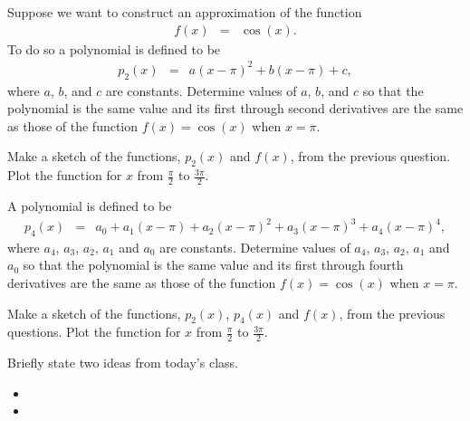 \begin{problem}
\item Suppose we want to construct an approximation of the function
  \begin{eqnarray*}
    f(x) & = & \cos(x).
  \end{eqnarray*}
  To do so a polynomial is defined to be
  \begin{eqnarray*}
    p_2(x) & = & a (x-\pi)^2 + b (x-\pi) + c,
  \end{eqnarray*}
  where $a$, $b$, and $c$ are constants.  Determine
  values of $a$, $b$,  and $c$ so that the
  polynomial is the same value and its first through second
  derivatives are the same as those of the function $f(x)=\cos(x)$ when
  $x=\pi$.
  \vfill

\item Make a sketch of the functions, $p_2(x)$ and $f(x)$, from the
  previous question. Plot the function for $x$ from $\frac{\pi}{2}$ to
    $\frac{3\pi}{2}$.

  \vspace{5em}


  \clearpage

\item A polynomial is defined to be
  \begin{eqnarray*}
    p_4(x) & = &  a_0 + a_1 (x-\pi) +  a_2 (x-\pi)^2 +  a_3 (x-\pi)^3 +  a_4 (x-\pi)^4,
  \end{eqnarray*}
  where $a_4$, $a_3$, $a_2$, $a_1$ and $a_0$ are constants.  Determine
  values of $a_4$, $a_3$, $a_2$, $a_1$ and $a_0$ so that the
  polynomial is the same value and its first through fourth
  derivatives are the same as those of the function $f(x)=\cos(x)$ when
  $x=\pi$.

  \vfill

\item Make a sketch of the functions, $p_2(x)$, $p_4(x)$ and $f(x)$,
  from the previous questions. Plot the function for $x$ from $\frac{\pi}{2}$ to
    $\frac{3\pi}{2}$.

  \vspace{5em}


\end{problem}


\postClass

\begin{problem}
\item Briefly state two ideas from today's class.
  \begin{itemize}
  \item
  \item
  \end{itemize}
\item
  \begin{subproblem}
    \item
  \end{subproblem}
\end{problem}


